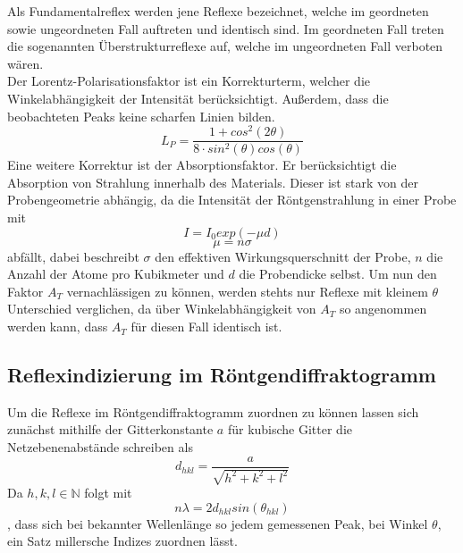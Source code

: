             Als Fundamentalreflex werden jene Reflexe bezeichnet, welche im geordneten sowie ungeordneten
            Fall auftreten und identisch sind. Im geordneten Fall treten die sogenannten Überstrukturreflexe
            auf, welche im ungeordneten Fall verboten wären.\\

            Der Lorentz-Polarisationsfaktor ist ein Korrekturterm, welcher die Winkelabhängigkeit der Intensität berücksichtigt. Außerdem,
            dass die beobachteten Peaks keine scharfen Linien bilden.
            \begin{equation}
                L_P = \frac{1 + cos^2(2 \theta)}{8 \cdot sin^2(\theta) cos(\theta)}
                \label{Lorentz-Polarisationsfaktor}
            \end{equation}
            Eine weitere Korrektur ist der Absorptionsfaktor. Er berücksichtigt die Absorption von Strahlung innerhalb des Materials.
            Dieser ist stark von der Probengeometrie abhängig, da die Intensität der Röntgenstrahlung in einer Probe mit
            $$ I = I_0 exp(-\mu d)$$
            $$ \mu = n \sigma$$
            abfällt, dabei beschreibt $\sigma$ den effektiven Wirkungsquerschnitt der Probe, $n$ die Anzahl der Atome pro Kubikmeter und $d$ die Probendicke selbst.
            Um nun den Faktor $A_T$ vernachlässigen zu können, werden stehts nur Reflexe mit kleinem $\theta$ Unterschied verglichen, da
            über Winkelabhängigkeit von $A_T$ so angenommen werden kann, dass $A_T$ für diesen Fall identisch ist.
            
        \subsection{Reflexindizierung im Röntgendiffraktogramm}
            Um die Reflexe im Röntgendiffraktogramm zuordnen zu können lassen sich zunächst mithilfe der Gitterkonstante $a$ für
            kubische Gitter die Netzebenenabstände schreiben als
            \begin{equation}
                d_{hkl} = \frac{a}{\sqrt{h^2+k^2+l^2}}
            \end{equation}
            Da $h,k,l\in \mathbb{N} $ folgt mit
            \begin{equation}
                n\lambda = 2d_{hkl}sin(\theta_{hkl})
            \end{equation}
            , dass sich bei bekannter Wellenlänge so jedem gemessenen Peak, bei Winkel $\theta$, ein Satz millersche Indizes
            zuordnen lässt.
        
